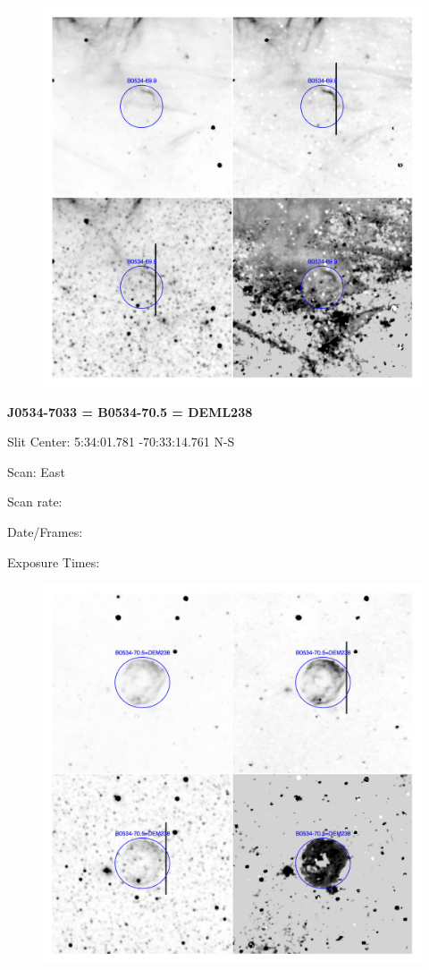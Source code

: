 \documentclass[11pt]{article}
\begin{document}
\begin{figure}
\includegraphics[width=11.cm]{snapshots/B0534-699.png}
\end{figure}

\newpage
{\bf J0534-7033 = B0534-70.5 = DEML238}  
 
Slit Center:   5:34:01.781 -70:33:14.761  N-S

Scan:  East

Scan rate:  

Date/Frames:

Exposure Times:  

\begin{figure}
\includegraphics[width=11.cm]{snapshots/B0534-705.png}
\end{figure}
\end{document}

